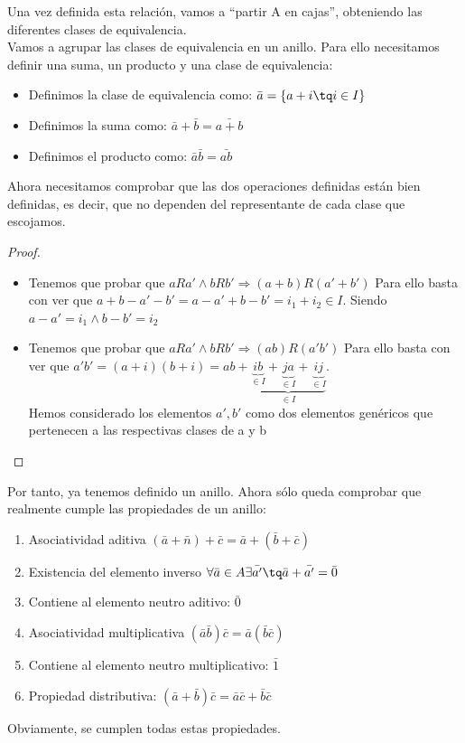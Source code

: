 \documentclass[nochap]{apuntes}
\begin{document}
Una vez definida esta relación, vamos a ``partir A en cajas'', obteniendo las diferentes clases de equivalencia.\\
Vamos a agrupar las clases de equivalencia en un anillo. Para ello necesitamos definir una suma, un producto y una clase de equivalencia:\\
\begin{itemize}
 \item Definimos la clase de equivalencia como: $\bar{a}=\{a+i \tq i \in I\}$
 \item Definimos la suma como: $\bar{a}+\bar{b}=\bar{a+b}$
 \item Definimos el producto como: $\bar{a}\bar{b}=\bar{ab}$
\end{itemize}
Ahora necesitamos comprobar que las dos operaciones definidas están bien definidas, es decir, que no dependen del representante de cada
clase que escojamos.
\begin{proof}
 \begin{itemize}
  \item Tenemos que probar que $aRa' \wedge bRb' \Rightarrow (a+b)R(a'+b')$
  Para ello basta con ver que $a+b-a'-b'=a-a'+b-b'=i_1+i_2 \in I$. Siendo $a-a'=i_1 \wedge b-b'=i_2$
  \item Tenemos que probar que $aRa' \wedge bRb' \Rightarrow (ab)R(a'b')$
  Para ello basta con ver que $a'b'=(a+i)(b+i)=ab+\underbrace{\underbrace{ib}_{\in I}+\underbrace{ja}_{\in I}+\underbrace{ij}_{\in I}}_{\in I}$.\\
  Hemos considerado los elementos $a', b'$  como dos elementos genéricos que pertenecen a las respectivas clases de a y b
 \end{itemize}
\end{proof}

Por tanto, ya tenemos definido un anillo. Ahora sólo queda comprobar que realmente cumple las propiedades de un anillo:
\begin{enumerate}
 \item Asociatividad aditiva $(\bar{a}+\bar{n})+\bar{c}=\bar{a}+(\bar{b}+\bar{c})$
 \item Existencia del elemento inverso $\forall \bar{a} \in A \exists \bar{a'} \tq \bar{a}+\bar{a'}=\bar{0}$
 \item Contiene al elemento neutro aditivo: $\bar{0}$
 \item Asociatividad multiplicativa $(\bar{a}\bar{b})\bar{c}=\bar{a}(\bar{b}\bar{c})$
 \item Contiene al elemento neutro multiplicativo: $\bar{1}$
 \item Propiedad distributiva: $(\bar{a}+\bar{b})\bar{c}=\bar{a}\bar{c}+\bar{b}\bar{c}$
\end{enumerate}
Obviamente, se cumplen todas estas propiedades.
\end{document}

